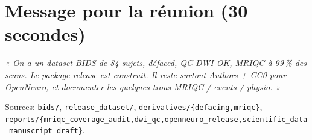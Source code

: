 \documentclass[11pt,a4paper]{article}
\begin{document}
\section*{Message pour la réunion (30 secondes)}
\textit{« On a un dataset BIDS de 84 sujets, défaced, QC DWI OK, MRIQC à 99\,\% des scans. Le package release est construit. Il reste surtout Authors + CC0 pour OpenNeuro, et documenter les quelques trous MRIQC / events / physio. »}

\vspace{4mm}
{\footnotesize Sources: \texttt{bids/}, \texttt{release\_dataset/}, \texttt{derivatives/\{defacing,mriqc\}}, \texttt{reports/\{mriqc\_coverage\_audit,dwi\_qc,openneuro\_release,scientific\_data\_manuscript\_draft\}}.}
\end{document}
